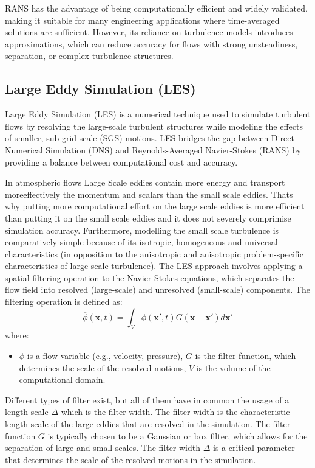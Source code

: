 RANS has the advantage of being computationally efficient and widely validated, making it suitable for many engineering applications where time-averaged solutions are sufficient.
However, its reliance on turbulence models introduces approximations, which can reduce accuracy for flows with strong unsteadiness, separation, or complex turbulence structures.

\subsection{Large Eddy Simulation (LES)}
Large Eddy Simulation (LES) is a numerical technique used to simulate turbulent flows by resolving the large-scale turbulent structures 
while modeling the effects of smaller, sub-grid scale (SGS) motions. LES bridges the gap between Direct Numerical Simulation (DNS) 
and Reynolds-Averaged Navier-Stokes (RANS) by providing a balance between computational cost and accuracy.

In atmospheric flows Large Scale eddies contain more energy and transport moreeffectively the 
momentum and scalars than the small scale eddies\cite{spalart2000}. Thats why putting
more computational effort on the large scale eddies is more efficient than putting it on the small scale eddies and it 
does not severely comprimise simulation accuracy. Furthermore, modelling the small scale turbulence is comparatively simple because of
its isotropic, homogeneous and universal characteristics (in opposition to the anisotropic and
anisotropic problem-specific characteristics of large scale turbulence).
The LES approach involves applying a spatial filtering operation to the Navier-Stokes equations,
which separates the flow field into resolved (large-scale) and unresolved (small-scale) components.
The filtering operation is defined as: 
\begin{equation}
\overline{\phi}(\mathbf{x}, t) = \int_V \phi(\mathbf{x}', t) G(\mathbf{x} - \mathbf{x}') d\mathbf{x}'
\end{equation}
where:
\begin{itemize}
    \item $\phi$ is a flow variable (e.g., velocity, pressure), $G$ is the filter function, which determines the scale of the resolved motions, $V$ is the volume of the computational domain.
\end{itemize}

Different types of filter exist, but all of them have in common the
usage of a length scale $\Delta$ which is the filter width. The filter width
is the characteristic length scale of the large eddies that are resolved in the simulation.
The filter function $G$ is typically chosen to be a Gaussian or box filter,
which allows for the separation of large and small scales. The filter width $\Delta$ is a critical parameter that determines the scale of the resolved motions in the simulation.

